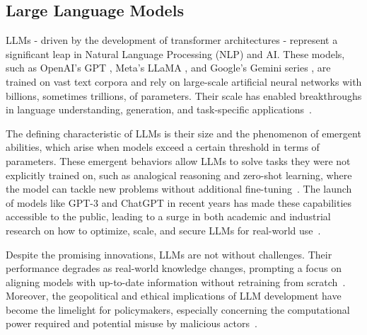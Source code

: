 \documentclass[acmsmall,nonacm]{acmart}
\begin{document}
    \subsection{Large Language Models}
        LLMs - driven by the development of transformer architectures \cite{vaswani2017attention} - represent a significant leap in Natural Language Processing (NLP) and AI. These models, such as OpenAI’s GPT \cite{achiam2023gpt}, Meta’s LLaMA \cite{touvron2023llama}, and Google’s Gemini series \cite{team2023gemini}, are trained on vast text corpora and rely on large-scale artificial neural networks with billions, sometimes trillions, of parameters. Their scale has enabled breakthroughs in language understanding, generation, and task-specific applications~\cite{nguyen2023vigptqa,tran2024uccix,10433480,peikos2024leveraging,dong2024can}.

        The defining characteristic of LLMs is their size and the phenomenon of emergent abilities, which arise when models exceed a certain threshold in terms of parameters. These emergent behaviors allow LLMs to solve tasks they were not explicitly trained on, such as analogical reasoning and zero-shot learning, where the model can tackle new problems without additional fine-tuning~\cite{schaeffer2024emergent}. The launch of models like GPT-3 and ChatGPT in recent years has made these capabilities accessible to the public, leading to a surge in both academic and industrial research on how to optimize, scale, and secure LLMs for real-world use~\cite{fan2024bibliometric}.
    
        Despite the promising innovations, LLMs are not without challenges. Their performance degrades as real-world knowledge changes, prompting a focus on aligning models with up-to-date information without retraining from scratch~\cite{cuconasu2024power,chang2024survey}. Moreover, the geopolitical and ethical implications of LLM development have become the limelight for policymakers, especially concerning the computational power required and potential misuse by malicious actors~\cite{10.1145/3605943,10.1145/3649449}.
\end{document}
